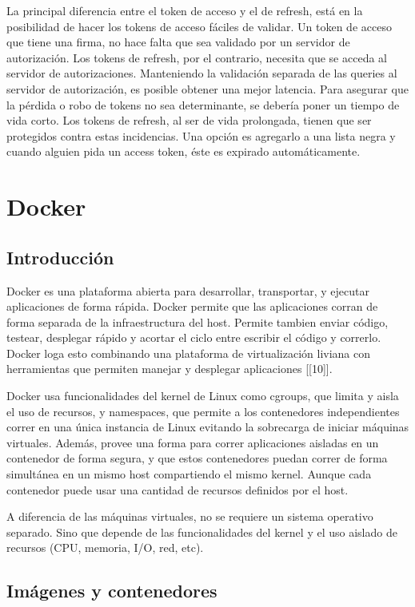 La principal diferencia entre el token de acceso y el de refresh, está en la posibilidad de hacer los tokens de acceso fáciles de validar. Un token de acceso que tiene una firma, no hace falta que sea validado por un servidor de autorización.
Los tokens de refresh, por el contrario, necesita que se acceda al servidor de autorizaciones. Manteniendo la validación separada de las queries al servidor de autorización, es posible obtener una mejor latencia.
Para asegurar que la pérdida o robo de tokens no sea determinante, se debería poner un tiempo de vida corto.
Los tokens de refresh, al ser de vida prolongada, tienen que ser protegidos contra estas incidencias. 
Una opción es agregarlo a una lista negra y cuando alguien pida un access token, éste es expirado automáticamente.

\section[Docker]{Docker}

\subsection[Introducción]{Introducción}

Docker es una plataforma abierta para desarrollar, transportar, y ejecutar aplicaciones de forma rápida. Docker permite que las aplicaciones corran de forma separada de la infraestructura del host. Permite tambien enviar código, testear, desplegar rápido y acortar el ciclo entre escribir el código y correrlo. Docker loga esto combinando una plataforma de virtualización liviana con herramientas que permiten manejar y desplegar aplicaciones [[10]].

Docker usa funcionalidades del kernel de Linux como cgroups, que limita y aisla el uso de recursos, y namespaces, que permite a los contenedores independientes correr en una única instancia de Linux evitando la sobrecarga de iniciar máquinas virtuales.
Además, provee una forma para correr aplicaciones aisladas en un contenedor de forma segura, y que estos contenedores puedan correr de forma simultánea en un mismo host compartiendo el mismo kernel. Aunque cada contenedor puede usar una cantidad de recursos definidos por el host.

A diferencia de las máquinas virtuales, no se requiere un sistema operativo separado. Sino que depende de las funcionalidades del kernel y el uso aislado de recursos (CPU, memoria, I/O, red, etc).

\subsection[Imágenes y contenedores]{Imágenes y contenedores}

